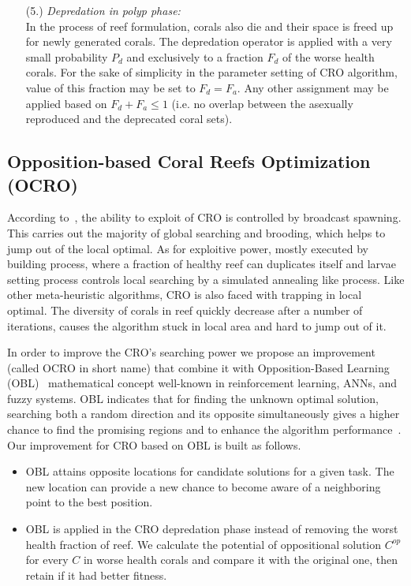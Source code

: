 \documentclass[review,3p,authoryear]{elsarticle}
\begin{document}
\begin{enumerate}
\item[(5.)] \textit{Depredation in polyp phase:} \\
In the process of reef formulation, corals also die and their space is freed up for newly generated corals. The depredation operator is applied with a very small probability $P_{d}$ and exclusively to a fraction $F_{d}$ of the worse health corals. For the sake of simplicity in the parameter setting of CRO algorithm, value of this fraction may be set to $F_{d}=F_{a}$. Any other assignment may be applied based on $F_{d}+F_{a}\leq1$ (i.e. no overlap between the asexually reproduced and the deprecated coral sets).
\end{enumerate}

\subsection{Opposition-based Coral Reefs Optimization (OCRO)}		
\label{ocro}

According to~\citep{ref_salcedo_sanz5}, the ability to exploit of CRO is controlled by broadcast spawning. This carries out the majority of global searching and brooding, which helps to jump out of the local optimal. As for exploitive power, mostly executed by building process, where a fraction of healthy reef can duplicates itself and larvae setting process controls local searching by a simulated annealing like process. Like other meta-heuristic algorithms, CRO is also faced with trapping in local optimal. The diversity of corals in reef quickly decrease after a number of iterations, causes the algorithm stuck in local area and hard to jump out of it. 

In order to improve the CRO's searching power we propose an improvement (called OCRO in short name) that combine it with Opposition-Based Learning (OBL)~\citep{ref_Tizhoosh} mathematical concept well-known in reinforcement learning, ANNs, and fuzzy systems. OBL indicates that for finding the unknown optimal solution, searching both a random direction and its opposite simultaneously gives a higher chance to find the promising regions and to enhance the algorithm performance~\citep{mahdavi2018opposition}. Our improvement for CRO based on OBL is built as follows.

\begin{itemize}
	\item OBL attains opposite locations for candidate solutions for a given task. The new location can provide a new chance to become aware of a neighboring point to the best position. 
	\item OBL is applied in the CRO depredation phase instead of removing the worst health fraction of reef. We calculate the potential of oppositional solution $C^{op}$ for every $C$ in worse health corals and compare it with the original one, then retain if it had better fitness.
\end{itemize}
\end{document}
